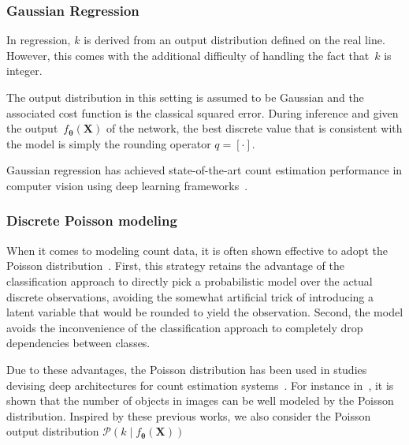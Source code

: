 \subsubsection{Gaussian Regression}
In regression, $k$ is derived from an output distribution defined on the real line.
However, this comes with the additional difficulty of handling the fact that~$k$ is integer.

The output distribution in this setting is assumed to be Gaussian and the associated cost function is the classical squared error.
During inference and given the output~$f_{\boldsymbol{\theta}}\left(\mathbf{X}\right)$ of the network, the best discrete value that is consistent with the model is simply the rounding operator $q = \left[\cdot\right]$.

Gaussian regression has achieved state-of-the-art count estimation performance in computer vision using deep learning frameworks~\cite{zhang15, marsden16, boominathan16}.

\subsubsection{Discrete Poisson modeling}
When it comes to modeling count data, it is often shown effective to adopt the Poisson distribution~\cite{fallah09}.
First, this strategy retains the advantage of the classification approach to directly pick a probabilistic model over the actual discrete observations, avoiding the somewhat artificial trick of introducing a latent variable that would be rounded to yield the observation.
Second, the model avoids the inconvenience of the classification approach to completely drop dependencies between classes.

Due to these advantages, the Poisson distribution has been used in studies devising deep architectures for count estimation systems~\cite{Rezatofigh16}.
For instance in~\cite{fallah09, chan09, Rezatofigh16}, it is shown that the number of objects in images can be well modeled by the Poisson distribution. Inspired by these previous works, we also consider the Poisson output distribution \(\mathcal{P}\left(k\mid f_{\boldsymbol{\theta}}\left(\mathbf{X}\right)\right)\)

